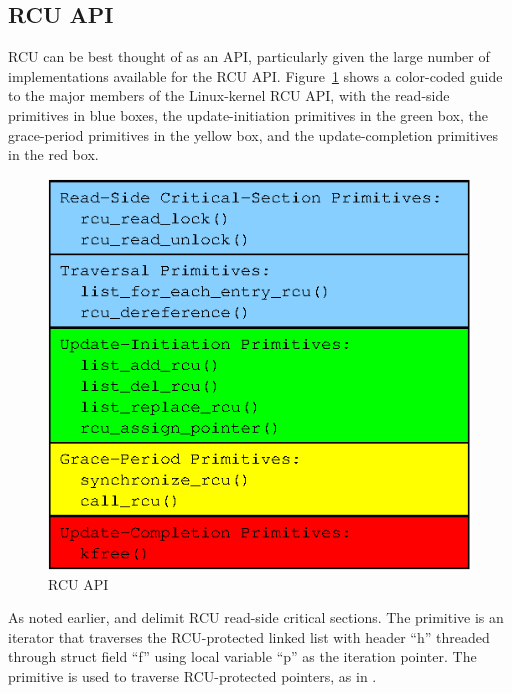 \subsection{RCU API}
\label{sec:advsync:RCU API}

RCU can be best thought of as an API, particularly given the large number
of implementations available for the RCU API.
Figure~\ref{fig:advsync:RCU API}
shows a color-coded guide to the major members of the Linux-kernel
RCU API, with the read-side primitives in blue boxes, the update-initiation
primitives in the green box, the grace-period primitives in the yellow box,
and the update-completion primitives in the red box.

\begin{figure}[htb]
\begin{center}
\includegraphics{advsync/RCU-API}
\end{center}
\caption{RCU API}
\label{fig:advsync:RCU API}
\end{figure}

As noted earlier,  and 
delimit RCU read-side critical sections.
The  primitive is an iterator that
traverses the RCU-protected linked list with header ``h'' threaded
through struct field ``f'' using
local variable ``p'' as the iteration pointer.
The  primitive is used to traverse RCU-protected
pointers, as in .

